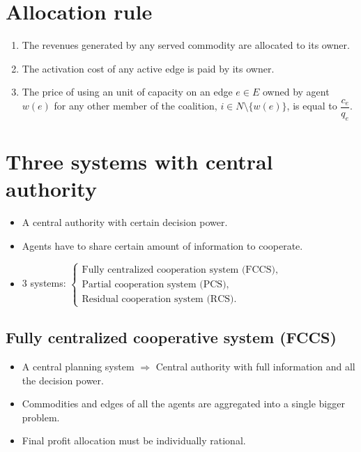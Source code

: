\documentclass[aspectratio=169]{beamer}
\begin{document}
\section{Allocation rule}

\begin{frame}{\secname}
\begin{enumerate}
	\setlength\itemsep{1em}
    \item The revenues generated by any served commodity are
    allocated to its owner.
    \item The activation cost of any active edge is paid by its owner.
    \item The price of using an unit of capacity on an edge $e\in E$ owned by agent $w(e)$ for any other member of the coalition, $i\in N\setminus\{w(e)\}$, is equal to $\dfrac{c_e}{q_e}$.
\end{enumerate}
\end{frame}


\section{Three systems with central authority}
\begin{frame}{\secname}
\begin{itemize}
\setlength\itemsep{1em}

\item A central authority with certain decision power.
\item Agents have to share certain amount of information to cooperate.
\item 3 systems: $\begin{cases}
\text{Fully centralized cooperation system (FCCS),}\\
\text{Partial cooperation system (PCS),} \\
\text{Residual cooperation system (RCS).}
\end{cases}$
\end{itemize}
\end{frame}

\subsection*{Fully centralized cooperative system (FCCS)} 
\begin{frame}{\subsecname}
\begin{itemize}
\setlength\itemsep{1em}
\item A central planning system $\Longrightarrow$ Central authority with \alert{full information} and \alert{all the decision power.}
\item Commodities and edges of all the agents are aggregated into a single bigger problem.
\item Final profit allocation must be \alert{individually rational}.
\end{itemize}
\end{frame}
\end{document}
